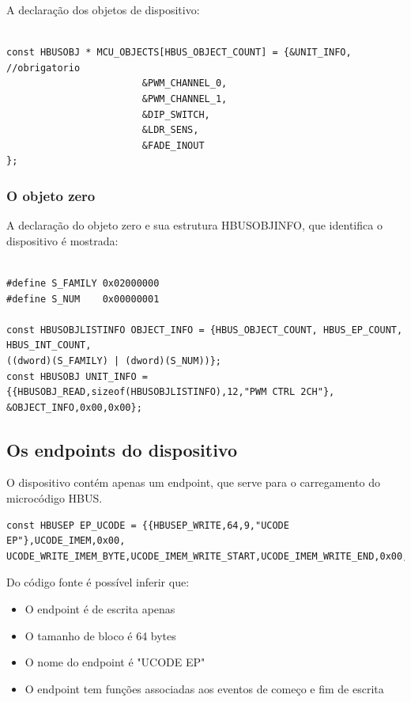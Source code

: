A declaração dos objetos de dispositivo:

\begin{verbatim}

const HBUSOBJ * MCU_OBJECTS[HBUS_OBJECT_COUNT] = {&UNIT_INFO, //obrigatorio
						&PWM_CHANNEL_0,
						&PWM_CHANNEL_1,
						&DIP_SWITCH,
						&LDR_SENS,
						&FADE_INOUT
};

\end{verbatim}

\subsubsection{O objeto zero}

A declaração do objeto zero e sua estrutura HBUSOBJINFO, que identifica o dispositivo é mostrada:

\begin{verbatim}

#define S_FAMILY 0x02000000
#define S_NUM    0x00000001

const HBUSOBJLISTINFO OBJECT_INFO = {HBUS_OBJECT_COUNT, HBUS_EP_COUNT, HBUS_INT_COUNT, 
((dword)(S_FAMILY) | (dword)(S_NUM))};
const HBUSOBJ UNIT_INFO = {{HBUSOBJ_READ,sizeof(HBUSOBJLISTINFO),12,"PWM CTRL 2CH"},
&OBJECT_INFO,0x00,0x00};

\end{verbatim}

\subsection{Os endpoints do dispositivo}

O dispositivo contém apenas um endpoint, que serve para o carregamento do microcódigo HBUS.

\begin{verbatim}
const HBUSEP EP_UCODE = {{HBUSEP_WRITE,64,9,"UCODE EP"},UCODE_IMEM,0x00,
UCODE_WRITE_IMEM_BYTE,UCODE_IMEM_WRITE_START,UCODE_IMEM_WRITE_END,0x00,0x00};
\end{verbatim}

Do código fonte é possível inferir que:

\begin{itemize}

\item O endpoint é de escrita apenas
\item O tamanho de bloco é 64 bytes
\item O nome do endpoint é "UCODE EP"
\item O endpoint tem funções associadas aos eventos de começo e fim de escrita

\end{itemize}

